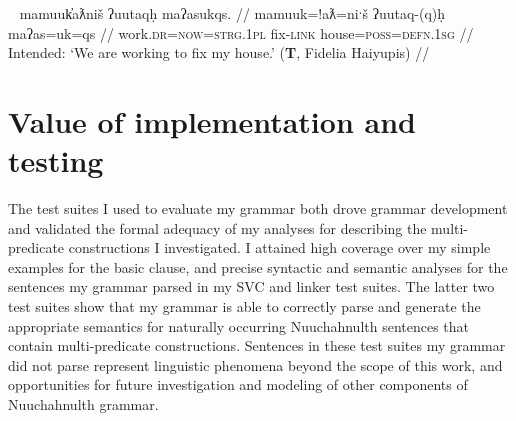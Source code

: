 \ex~ \label{ex:workfixhouse}
\begingl
\glpreamble *mamuuk̓aƛniš ʔuutaqḥ maʔasukqs. //
\gla mamuuk=!aƛ=niˑš ʔuutaq-(q)ḥ maʔas=uk=qs //
\glb work.\textsc{dr}=\textsc{now}=\textsc{strg.1pl} fix-\textsc{link} house=\textsc{poss}=\textsc{defn.1sg} //
\glft Intended: `We are working to fix my house.' (\textbf{T}, Fidelia Haiyupis) //
\endgl
\xe

\section{Value of implementation and testing} \label{ch:results:summary}

The test suites I used to evaluate my grammar both drove grammar development and validated the formal adequacy of my analyses for describing the multi-predicate constructions I investigated. I attained high coverage over my simple examples for the basic clause, and precise syntactic and semantic analyses for the sentences my grammar parsed in my SVC and linker test suites. The latter two test suites show that my grammar is able to correctly parse and generate the appropriate semantics for naturally occurring Nuuchahnulth sentences that contain multi-predicate constructions. Sentences in these test suites my grammar did not parse represent linguistic phenomena beyond the scope of this work, and opportunities for future investigation and modeling of other components of Nuuchahnulth grammar.